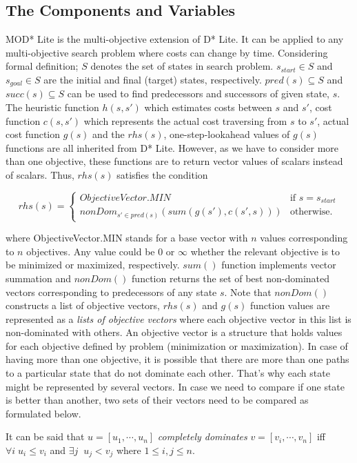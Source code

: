 \documentclass[10pt,journal]{IEEEtran}
\newenvironment{definition}[1][Definition]{\begin{trivlist}
\item[\hskip \labelsep {\bfseries #1}]}{\end{trivlist}}
\begin{document}
\subsection{The Components and Variables}
MOD* Lite is the multi-objective extension of D* Lite. It can be applied to any multi-objective search problem where costs can change by time. Considering formal definition; $S$ denotes the set of states in search problem. $s_{start} \in S$ and $s_{goal} \in S$ are the initial and final (target) states, respectively. $pred(s) \subseteq S$ and $succ(s) \subseteq S$ can be used to find predecessors and successors of given state, $s$. The heuristic function $h(s, s')$ which estimates costs between $s$ and $s'$, cost function $c(s, s')$ which represents the actual cost traversing from $s$ to $s'$, actual cost function $g(s)$ and the $rhs(s)$, one-step-lookahead values of $g(s)$ functions are all inherited from D* Lite. However, as we have to consider more than one objective, these functions are to return vector values of scalars instead of scalars. Thus, $rhs(s)$ satisfies the condition

\[ rhs(s) = \left\{ \begin{array}{lc}
ObjectiveVector.MIN & \mbox{if $s=s_{start}$}\\
nonDom_{s' \in pred(s)}(sum(g(s'), c(s', s))) & \mbox{otherwise}.\end{array} \right. \] 

where ObjectiveVector.MIN stands for a base vector with $n$ values corresponding to $n$ objectives. Any value  could be $0$ or $\infty$ whether the relevant objective is to be minimized or maximized, respectively. $sum()$ function implements vector summation and $nonDom()$ function returns the set of best non-dominated vectors corresponding to predecessors of any state $s$. Note that $nonDom()$ constructs a list of objective vectors, $rhs(s)$ and $g(s)$ function values are represented as a \textit{lists of objective vectors} where each objective vector in this list is non-dominated with others. An objective vector is a structure that holds values for each objective defined by problem (minimization or maximization). In case of having more than one objective, it is possible that there are more than one paths to a particular state that do not dominate each other. That's why each state might be represented by several vectors. In case we need to compare if one state is better than another, two sets of their vectors need to be compared as formulated below.

\begin{definition}
It can be said that $u=[u_1,\cdots,u_n]$ \textit{completely dominates} $v=[v_i,\cdots,v_n]$ iff $\forall i \; u_i \le v_i$ and $\exists j \;\; u_j < v_j$ where $1 \le i, j \le n$.
\end{definition}
\end{document}
